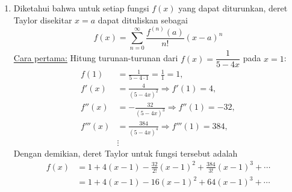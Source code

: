 \documentclass[11pt,openany,a4paper]{article}
\begin{document}
\begin{enumerate}
\[\begin{tikzpicture}[scale=0.3]
            \begin{scope}[xshift=-6.5cm]
                \draw[domain=pi/4:pi,smooth,samples=100,variable=\o, fill=yellow!70] plot ({deg(\o)}:{\fr});
                \draw[domain=pi/4:pi/2,smooth,samples=100,variable=\o, fill=white] plot ({deg(\o)}:{\gr});
            \end{scope}
        \end{tikzpicture}
        \]
        Sehingga perhitungan integral yang benar adalah
        \begin{align*}
            \text{Area} &= 4\pi - 2\left[\frac{1}{2}\int_{0}^{\frac{\pi}{4}} 4\sin^2\theta \, d\theta\right]\\
            &= 4\pi - 2\left[\int_{0}^{\frac{\pi}{4}} (1-\cos 2\theta) \, d\theta\right]\\
            &= 4\pi - 2\left[\theta - \frac{1}{2}\sin 2\theta\right]_{0}^{\frac{\pi}{4}}\\
            &= 4\pi - 2\left[\frac{\pi}{4} - \frac{1}{2}\sin \frac{\pi}{2}\right]\\
            &= 4\pi - 2\left[\frac{\pi}{4} - \frac{1}{2}\right]\\
            &= 4\pi - \frac{\pi}{2} + 1 = \boxed{\frac{7\pi}{2} + 1}
        \end{align*}
        \item Diketahui bahwa untuk setiap fungsi \( f(x) \) yang dapat diturunkan, deret Taylor disekitar \( x = a \) dapat dituliskan sebagai
        \[
            f(x) = \sum_{n=0}^{\infty} \frac{f^{(n)}(a)}{n!} (x-a)^n
        \]
        \underline{Cara pertama:} Hitung turunan-turunan dari \( f(x) = \dfrac{1}{5-4x} \) pada \( x = 1 \):
        \begin{align*}
            f(1) &= \frac{1}{5-4\cdot 1} = \frac{1}{1} = 1,\\
            f'(x) &= \frac{4}{(5-4x)^2} \Rightarrow f'(1) = 4,\\
            f''(x) &= -\frac{32}{(5-4x)^3} \Rightarrow f''(1) = -32,\\
            f'''(x) &= \frac{384}{(5-4x)^4} \Rightarrow f'''(1) = 384,\\
            &\vdots
        \end{align*}
        Dengan demikian, deret Taylor untuk fungsi tersebut adalah
        \begin{align*}
            f(x) &= 1 + 4(x-1) - \frac{32}{2!}(x-1)^2 + \frac{384}{3!}(x-1)^3 + \cdots \\
            &= 1 + 4(x-1) - 16(x-1)^2 + 64(x-1)^3 + \cdots \\

\end{align*}
\end{enumerate}
\end{document}
